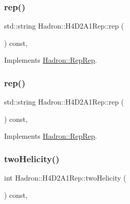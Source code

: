 \subsubsection{\texorpdfstring{rep()}{rep()}\hspace{0.1cm}{\footnotesize\ttfamily [2/3]}}
{\footnotesize\ttfamily std\+::string Hadron\+::\+H4\+D2\+A1\+Rep\+::rep (\begin{DoxyParamCaption}{ }\end{DoxyParamCaption}) const\hspace{0.3cm}{\ttfamily [inline]}, {\ttfamily [virtual]}}



Implements \mbox{\hyperlink{structHadron_1_1RepRep_ab3213025f6de249f7095892109575fde}{Hadron\+::\+Rep\+Rep}}.

\mbox{\label{structHadron_1_1H4D2A1Rep_ad4b2ccfecdb8297fd88eaa27c9d1262e}} 
\subsubsection{\texorpdfstring{rep()}{rep()}\hspace{0.1cm}{\footnotesize\ttfamily [3/3]}}
{\footnotesize\ttfamily std\+::string Hadron\+::\+H4\+D2\+A1\+Rep\+::rep (\begin{DoxyParamCaption}{ }\end{DoxyParamCaption}) const\hspace{0.3cm}{\ttfamily [inline]}, {\ttfamily [virtual]}}



Implements \mbox{\hyperlink{structHadron_1_1RepRep_ab3213025f6de249f7095892109575fde}{Hadron\+::\+Rep\+Rep}}.

\mbox{\label{structHadron_1_1H4D2A1Rep_ade522129ee7018a431237c9d04e13351}} 
\subsubsection{\texorpdfstring{twoHelicity()}{twoHelicity()}\hspace{0.1cm}{\footnotesize\ttfamily [1/2]}}
{\footnotesize\ttfamily int Hadron\+::\+H4\+D2\+A1\+Rep\+::two\+Helicity (\begin{DoxyParamCaption}{ }\end{DoxyParamCaption}) const\hspace{0.3cm}{\ttfamily [inline]}, {\ttfamily [virtual]}}

